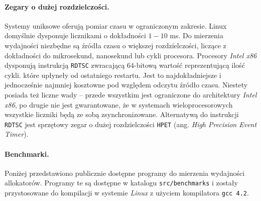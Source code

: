 \documentclass[12pt,a4paper,titlepage,twoside]{mwart}
\begin{document}
\paragraph{Zegary o dużej rozdzielczości.} Systemy uniksowe oferują pomiar
czasu w ograniczonym zakresie. Linux domyślnie dysponuje licznikami o
dokładności $1-10$ ms. Do mierzenia wydajności niezbędne są źródła czasu o
większej rozdzielczości, liczące z dokładności do mikrosekund, nanosekund lub
cykli procesora. Procesory \textit{Intel x86} dysponują instrukcją
\texttt{RDTSC} zwracającą $64$-bitową wartość reprezentującą ilość cykli.
które upłyneły od ostatniego restartu. Jest to najdokładniejsze i jednocześnie
najmniej kosztowne pod względem odczytu źródło czasu. Niestety posiada też
liczne wady -- przede wszystkim jest ograniczone do architektury \textit{Intel
x86}, po drugie nie jest gwarantowane, że w systemach wieloprocesorowych
wszystkie liczniki będą ze sobą zsynchronizowane. Alternatywą do instrukcji
\texttt{RDTSC} jest sprzętowy zegar o dużej rozdzielczości \texttt{HPET} (ang.
\textit{High Precision Event Timer}).

\paragraph{Benchmarki.} Poniżej przedstawiono publicznie dostępne programy do
mierzenia wydajności allokatorów. Programy te są dostępne w katalogu
\texttt{src/benchmarks} i zostały przystosowane do kompilacji w systemie
\textit{Linux} z użyciem kompilatora \texttt{gcc 4.2}.
\end{document}
